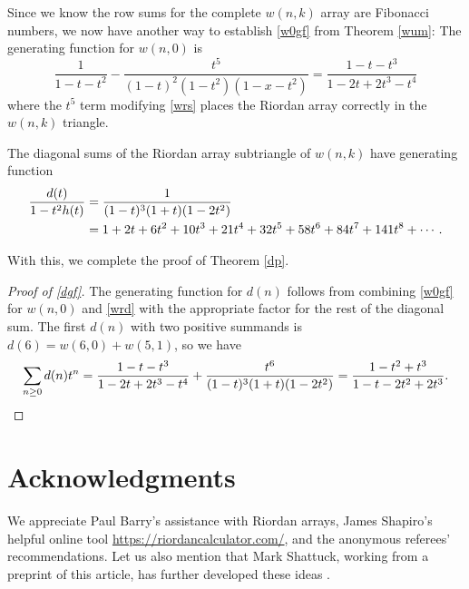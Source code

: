 \documentclass[]{interact}
\theoremstyle{plain}
\numberwithin{equation}{section} %
\numberwithin{table}{section} %
\numberwithin{figure}{section}
\begin{document}
Since we know the row sums for the complete $w(n,k)$ array are Fibonacci numbers, we now have another way to establish \eqref{w0gf} from Theorem \ref{wum}: The generating function for $w(n,0)$ is
\[ \frac{1}{1 - t - t^2} - \frac{t^5}{(1 - t)^2 (1 - t^2) (1 - x - t^2)} = \frac{1-t-t^3}{1 - 2 t + 2 t^3 - t^4} \]
where the $t^5$ term modifying \eqref{wrs} places the Riordan array correctly in the $w(n,k)$ triangle.

The diagonal sums of the Riordan array subtriangle of $w(n,k)$ have generating function
\begin{align}
\frac{d(t)}{1-t^2 h(t)} & = \frac{1}{(1 - t)^3 (1 + t) (1 - 2 t^2)} \label{wrd} \\
& = 1 + 2 t + 6 t^2 + 10 t^3 + 21 t^4 + 32 t^5 + 58 t^6 + 84 t^7 +  141 t^8 + \cdots. \notag 
\end{align}

With this, we complete the proof of Theorem \ref{dp}.

\begin{proof}[Proof of \eqref{dgf}]
The generating function for $d(n)$ follows from combining \eqref{w0gf} for $w(n,0)$ and \eqref{wrd} with the appropriate factor for the rest of the diagonal sum.  The first $d(n)$ with two positive summands is $d(6) = w(6,0) + w(5,1)$, 
so we have
\[ \sum_{n\ge0} d(n) t^n = \frac{1-t-t^3}{1 - 2 t + 2 t^3 - t^4} + \frac{t^6}{(1 - t)^3 (1 + t) (1 - 2 t^2)} = \frac{1 - t^2 + t^3}{1 - t -2t^2 + 2t^3}. \qedhere\]
\end{proof}

\section*{Acknowledgments}
We appreciate Paul Barry's assistance with Riordan arrays, James Shapiro's helpful online tool \url{https://riordancalculator.com/}, and the anonymous referees' recommendations.  Let us also mention that Mark Shattuck, working from a preprint of this article, has further developed these ideas \cite{s25}.
\end{document}
